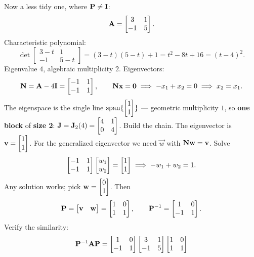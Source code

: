 \begin{example}
\label{ch28:ex-notjordan}
Now a less tidy one, where $\mathbf{P}\neq\mathbf{I}$:
\[
\mathbf{A}=\begin{bmatrix}3&1\\-1&5\end{bmatrix}.
\]
Characteristic polynomial:
\[
\det\begin{bmatrix}3-t&1\\-1&5-t\end{bmatrix}
=(3-t)(5-t)+1=t^2-8t+16=(t-4)^2.
\]
Eigenvalue $4$, algebraic multiplicity $2$. Eigenvectors:
\[
\mathbf{N}=\mathbf{A}-4\mathbf{I}=\begin{bmatrix}-1&1\\-1&1\end{bmatrix},\qquad
\mathbf{N}\mathbf{x}=\mathbf{0}\;\Longrightarrow\; -x_1+x_2=0\;\Longrightarrow\; x_2=x_1.
\]
The eigenspace is the single line $\operatorname{span}\{\begin{bmatrix}1\\1\end{bmatrix}\}$ --- geometric multiplicity $1$,
so \textbf{one block} of \textbf{size 2}: $\mathbf{J}=\mathbf{J}_2(4)=\begin{bmatrix}4&1\\0&4\end{bmatrix}$.
Build the chain. The eigenvector is $\mathbf{v}=\begin{bmatrix}1\\1\end{bmatrix}$. For the generalized
eigenvector we need $\vec{w}$ with $\mathbf{N}\mathbf{w}=\mathbf{v}$. Solve
\[
\begin{bmatrix}-1&1\\-1&1\end{bmatrix}\begin{bmatrix}w_1\\w_2\end{bmatrix}=\begin{bmatrix}1\\1\end{bmatrix}
\;\Longrightarrow\; -w_1+w_2=1.
\]
Any solution works; pick $\mathbf{w}=\begin{bmatrix}0\\1\end{bmatrix}$. Then
\[
\mathbf{P}=\begin{bmatrix}\mathbf{v}&\mathbf{w}\end{bmatrix}=\begin{bmatrix}1&0\\1&1\end{bmatrix},
\qquad \mathbf{P}^{-1}=\begin{bmatrix}1&0\\-1&1\end{bmatrix}.
\]
Verify the similarity:
\[
\mathbf{P}^{-1}\mathbf{A}\mathbf{P}
=\begin{bmatrix}1&0\\-1&1\end{bmatrix}\begin{bmatrix}3&1\\-1&5\end{bmatrix}\begin{bmatrix}1&0\\1&1\end{bmatrix}
\]
\end{example}
